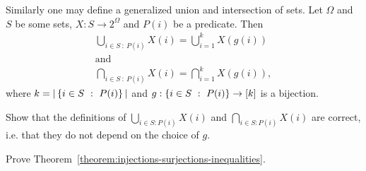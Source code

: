 Similarly one may define a generalized union and intersection of sets.
Let $\Omega$ and $S$ be some sets, $X : S \to 2^\Omega$ and $P(i)$ be a
predicate. Then
\begin{gather*}
    \bigcup_{i \in S ~:~ P(i)} X(i) = \bigcup_{i = 1}^k X(g(i)) \\
    \text{and}\\
    \bigcap_{i \in S ~:~ P(i)} X(i) = \bigcap_{i = 1}^k X(g(i)),
\end{gather*}
where $k = |\set[P(i)]{i \in S}|$ and $g : \set[P(i)]{i \in S} \to \range{k}$ is
a bijection.

\begin{exercise}
    Show that the definitions of $\bigcup_{i \in S : P(i)} X(i)$ and
    $\bigcap_{i \in S : P(i)} X(i)$ are correct,
    i.e. that they do not depend on the choice of $g$.
\end{exercise}



\begin{chapterendexercises}
    \exercise Prove Theorem~\ref{theorem:injections-surjections-inequalities}.
\end{chapterendexercises}
